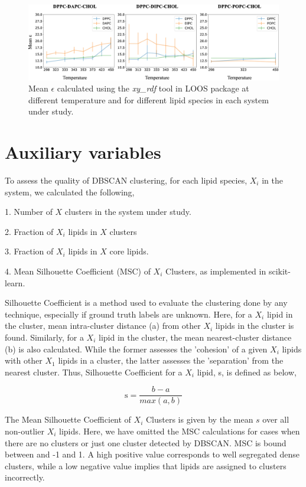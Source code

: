 \documentclass[10pt]{article}
\let\oldsection\section
\renewcommand{\section}{\clearpage\oldsection}
\begin{document}
\begin{figure}[hbt!]
    \centering
    \includegraphics[width=6.5in]{Figures/Supplementary/epsilon/placeholder.jpg}
    \caption{Mean $\epsilon$ calculated using the \textit{xy\_rdf} tool in LOOS package at different temperature and for different lipid species in each system under study.}
    \label{figs1:view}
\end{figure}

\section*{Auxiliary variables}

To assess the quality of DBSCAN clustering, for each lipid species, $X_i$ in the system, we calculated the following, 

1. Number of $X$ clusters in the system under study.

2. Fraction of $X_i$ lipids in $X$ clusters

3. Fraction of $X_i$ lipids in $X$ core lipids.

4. Mean Silhouette Coefficient (MSC) of $X_i$ Clusters, as implemented in scikit-learn.

Silhouette Coefficient is a method used to evaluate the clustering done by any technique, especially if ground truth labels are unknown. 
Here, for a $X_i$ lipid in the cluster, mean intra-cluster distance (a) from other $X_i$ lipids in the cluster is found.  
Similarly, for a $X_i$ lipid in the cluster, the mean nearest-cluster distance (b) is also calculated.
While the former assesses the 'cohesion' of a given $X_i$ lipids with other $X_1$ lipids in a cluster, the latter assesses the 'separation' from the nearest cluster.
Thus, Silhouette Coefficient for a $X_i$ lipid, s, is defined as below,

\begin{equation}
\label{eq:SC}
\text{s} = \frac{b - a}{max(a,b)}
\end{equation}

The Mean Silhouette Coefficient of $X_i$ Clusters is given by the mean $s$ over all non-outlier $X_i$ lipids.
Here, we have omitted the MSC calculations for cases when there are no clusters or just one cluster detected by DBSCAN. 
MSC is bound between and -1 and 1.
A high positive value corresponds to well segregated dense clusters, while a low negative value implies that lipids are assigned to clusters incorrectly.  
\end{document}
